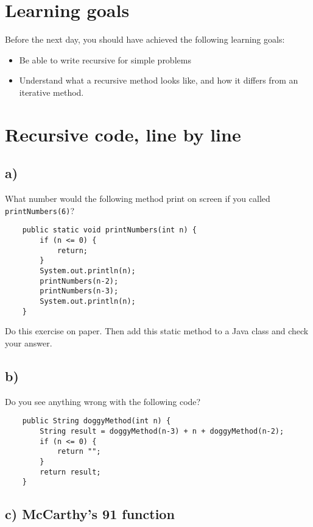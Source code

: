 \documentclass{article}
\begin{document}
\section*{Learning goals}
\label{sec:learning-goals}

Before the next day, you should have achieved the following learning
goals: 

\begin{itemize}
\item Be able to write recursive for simple problems
\item Understand what a recursive method looks like, and how it
  differs from an iterative method. 
\end{itemize}

\section{Recursive code, line by line}
\label{sec:read-recurs-code}

\subsection*{a)}

What number would the following method print on screen if you called
\verb+printNumbers(6)+?

\begin{verbatim}
    public static void printNumbers(int n) {
        if (n <= 0) {
            return;
        }
        System.out.println(n);
        printNumbers(n-2);
        printNumbers(n-3);
        System.out.println(n);
    }
\end{verbatim}

Do this exercise on paper. Then add this static method to a Java class
and check your answer. 

\subsection*{b)}
\label{sec:b-1}

Do you see anything wrong with the following code?

\begin{verbatim}
    public String doggyMethod(int n) {
        String result = doggyMethod(n-3) + n + doggyMethod(n-2);
        if (n <= 0) {
            return "";
        }
        return result;
    }
\end{verbatim}

\subsection*{c) McCarthy's 91 function}
\label{sec:c}
\end{document}
